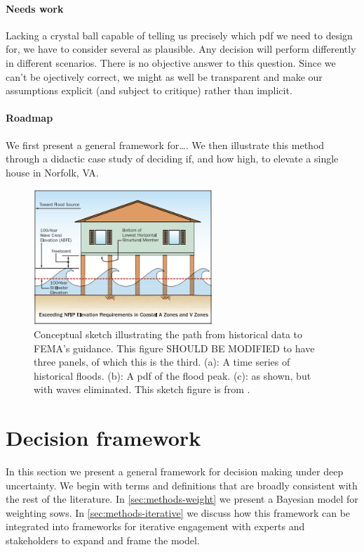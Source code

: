 \documentclass[12pt]{article}
\begin{document}
\paragraph{Needs work}
Lacking a crystal ball capable of telling us precisely which \gls{pdf} we need to design for, we have to consider several as plausible.
Any decision will perform differently in different scenarios.
There is no objective answer to this question.
Since we can't be ojectively correct, we might as well be transparent and make our assumptions explicit (and subject to critique) rather than implicit.

\paragraph{Roadmap}
We first present a general framework for\ldots.
We then illustrate this method through a didactic case study of deciding if, and how high, to elevate a single house in Norfolk, VA.

\begin{figure}
    \centering
    \includegraphics[height=2in]{uconn-elevateA}
    \caption{
        Conceptual sketch illustrating the path from historical data to FEMA's guidance.
        This figure SHOULD BE MODIFIED to have three panels, of which this is the third.
        (a): A time series of historical floods.
        (b): A \gls{pdf} of the flood peak.
        (c): as shown, but with waves eliminated.
        This sketch figure is from \citet{patten_elevate:2016}.
    }\label{fig:house-sketch}
\end{figure}

\section{Decision framework}\label{sec:framework}

In this section we present a general framework for decision making under deep uncertainty.
We begin with terms and definitions that are broadly consistent with the rest of the literature.
In \cref{sec:methods-weight} we present a Bayesian model for weighting \glspl{sow}.
In \cref{sec:methods-iterative} we discuss how this framework can be integrated into frameworks for iterative engagement with experts and stakeholders to expand and frame the model.
\end{document}
